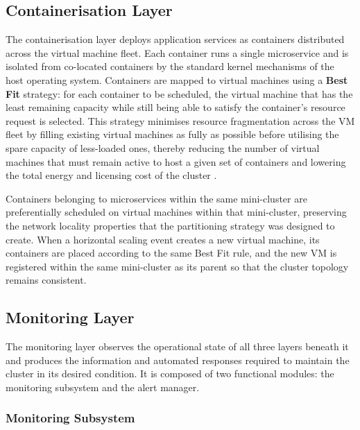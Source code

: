 \documentclass[a4paper, 12pt]{report}
\begin{document}
\subsection{Containerisation Layer}
 
The containerisation layer deploys application services as containers
distributed across the virtual machine fleet.  Each container runs a
single microservice and is isolated from co-located containers by the
standard kernel mechanisms of the host operating system.  Containers are
mapped to virtual machines using a \textbf{Best Fit} strategy: for each
container to be scheduled, the virtual machine that has the least
remaining capacity while still being able to satisfy the container's
resource request is selected.  This strategy minimises resource
fragmentation across the VM fleet by filling existing virtual machines
as fully as possible before utilising the spare capacity of less-loaded
ones, thereby reducing the number of virtual machines that must remain
active to host a given set of containers and lowering the total energy
and licensing cost of the cluster \cite{buyya2009cloud}.
 
Containers belonging to microservices within the same mini-cluster are
preferentially scheduled on virtual machines within that mini-cluster,
preserving the network locality properties that the partitioning strategy
was designed to create.  When a horizontal scaling event creates a new
virtual machine, its containers are placed according to the same Best
Fit rule, and the new VM is registered within the same mini-cluster as
its parent so that the cluster topology remains consistent.
 
\subsection{Monitoring Layer}
 
The monitoring layer observes the operational state of all three layers
beneath it and produces the information and automated responses required
to maintain the cluster in its desired condition.  It is composed of two
functional modules: the monitoring subsystem and the alert manager.
 
\subsubsection{Monitoring Subsystem}
 
\end{document}
